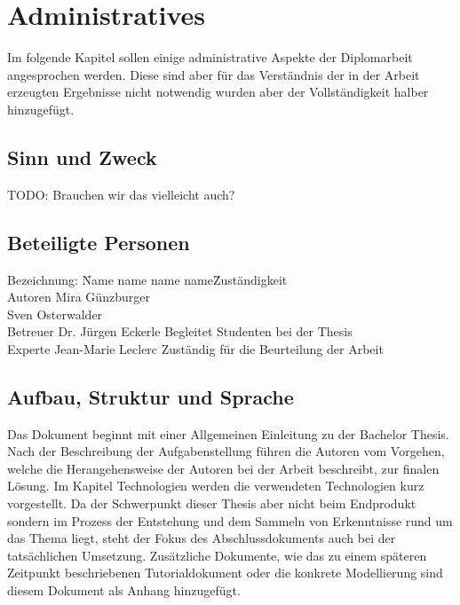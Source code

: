 \chapter{Administratives}
\label{chap:administratives}

Im folgende Kapitel sollen einige administrative Aspekte der Diplomarbeit angesprochen werden. Diese sind aber für das Verständnis der in der Arbeit erzeugten Ergebnisse nicht notwendig wurden aber der Vollständigkeit halber hinzugefügt.

\section{Sinn und Zweck}
\label{sec:admin_sinn}
TODO: Brauchen wir das vielleicht auch?

\section{Beteiligte Personen}
\label{sec:admin_beteiligte}
\begin{tabbing} %
Bezeichnung: \= Name name name name\= Zuständigkeit \kill \\
  Autoren           \>  Mira Günzburger   \> \\
										\> Sven Osterwalder    \> \\
	Betreuer           \> Dr. Jürgen Eckerle    \> Begleitet Studenten bei der Thesis\\
	Experte           \>  Jean-Marie Leclerc  \> Zuständig für die Beurteilung der Arbeit
\end{tabbing}

\section{Aufbau, Struktur und Sprache}
\label{sec:admin_aufbau}
Das Dokument beginnt mit einer Allgemeinen Einleitung zu der Bachelor Thesis. Nach der Beschreibung der Aufgabenstellung führen die Autoren vom Vorgehen, welche die Herangehensweise der Autoren bei der Arbeit beschreibt, zur finalen Lösung. Im Kapitel Technologien werden die verwendeten Technologien kurz vorgestellt. Da der Schwerpunkt dieser Thesis aber nicht beim Endprodukt sondern im Prozess der Entstehung und dem Sammeln von Erkenntnisse rund um das Thema liegt, steht der Fokus des Abschlussdokuments auch bei der tatsächlichen Umsetzung. 
Zusätzliche Dokumente, wie das zu einem späteren Zeitpunkt beschriebenen Tutorialdokument oder die konkrete Modellierung sind diesem Dokument als Anhang hinzugefügt.

